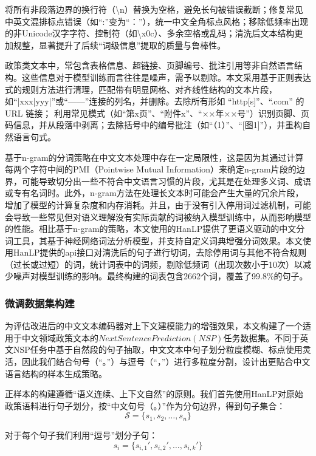 \documentclass[12pt, a4paper]{ctexart}
\begin{document}
将所有非段落边界的换行符（\textbackslash n）替换为空格，避免长句被错误截断；修复常见中英文混排标点错误（如“:”变为“：”），统一中文全角标点风格；移除低频率出现的非Unicode汉字字符、控制符（如\textbackslash x0c）、多余空格或乱码；清洗后文本结构更加规整，显著提升了后续“词级信息”提取的质量与鲁棒性。

政策类文本中，常包含表格信息、超链接、页脚编号、批注引用等非自然语言结构。这些信息对于模型训练而言往往是噪声，需予以剔除。本文采用基于正则表达式的规则方法进行清理，匹配带有明显网格、对齐线性结构的文本片段，如“|xxx|yyy|”或“——”连接的列名，并删除。去除所有形如 “http[s]”、“.com” 的 URL 链接；
利用常见模式（如“第x页”、“附件x”、“××年××号”）识别页脚、页码信息，并从段落中剥离；去除括号中的编号批注（如“（1）”、“[图1]”），并重构自然语言句式。

基于n-gram的分词策略在中文文本处理中存在一定局限性，这是因为其通过计算每两个字符中间的PMI（Pointwise Mutual Information）来确定n-gram片段的边界，可能导致切分出一些不符合中文语言习惯的片段，尤其是在处理多义词、成语或专有名词时。此外，n-gram方法在处理长文本时可能会产生大量的冗余片段，增加了模型的计算复杂度和内存消耗。并且，由于没有引入停用词过滤机制，可能会导致一些常见但对语义理解没有实际贡献的词被纳入模型训练中，从而影响模型的性能。相比基于n-gram的策略，本文使用的HanLP提供了更语义驱动的中文分词工具，其基于神经网络词法分析模型，并支持自定义词典增强分词效果。本文使用HanLP提供的api接口对清洗后的句子进行切词，去除停用词与其他不符合规则（过长或过短）的词，统计词表中的词频，剔除低频词（出现次数小于10次）以减少噪声对模型训练的影响。最终构建的词表包含2662个词，覆盖了99.8\%的句子。

\subsubsection{微调数据集构建}
为评估改进后的中文文本编码器对上下文建模能力的增强效果，本文构建了一个适用于中文领域政策文本的$Next Sentence Prediction (NSP)$任务数据集。不同于英文NSP任务中基于自然段的句子抽取，中文文本中句子划分粒度模糊、标点使用灵活，因此我们结合句号（“。”）与逗号（“，”）进行多粒度分割，设计出更贴合中文语言结构的样本生成策略。

正样本的构建遵循“语义连续、上下文自然”的原则。我们首先使用HanLP对原始政策语料进行句子划分，按“中文句号（。）”作为分句边界，得到句子集合：
\begin{equation}
\mathcal{S} = \{s_1, s_2, \ldots, s_n\}
\end{equation}

对于每个句子我们利用“逗号”划分子句：
\begin{equation}
s_i = \{s_{i,1}', s_{i,2}', \ldots, s_{i,k}'\}
\end{equation}
\end{document}
